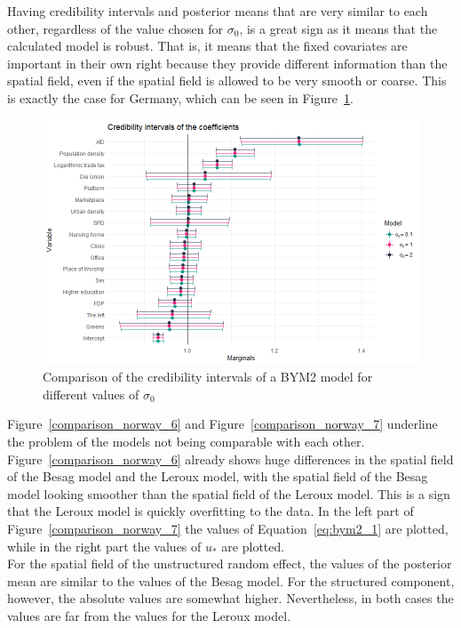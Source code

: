Having credibility intervals and posterior means that are very similar to each other, regardless of the value chosen for $\sigma_0$, is a great sign as it means that the calculated model is robust. That is, it means that the fixed covariates are important in their own right because they provide different information than the spatial field, even if the spatial field is allowed to be very smooth or coarse. This is exactly the case for Germany, which can be seen in Figure~\ref{comparison_germany_5}.
\begin{figure}[H]
    \centering
    \includegraphics[width = \textwidth]{intervals_prior_germany.png}
    \caption{Comparison of the credibility intervals of a BYM2 model for different values of $\sigma_0$}
    \label{comparison_germany_5}
\end{figure}
Figure~\ref{comparison_norway_6} and Figure~\ref{comparison_norway_7} underline the problem of the models not being comparable with each other. Figure~\ref{comparison_norway_6} already shows huge differences in the spatial field of the Besag model and the Leroux model, with the spatial field of the Besag model looking smoother than the spatial field of the Leroux model. This is a sign that the Leroux model is quickly overfitting to the data.
In the left part of Figure~\ref{comparison_norway_7} the values of Equation~\ref{eq:bym2_1} are plotted, while in the right part the values of $u_{*}$ are plotted. \\
For the spatial field of the unstructured random effect, the values of the posterior mean are similar to the values of the Besag model. For the structured component, however, the absolute values are somewhat higher. Nevertheless, in both cases the values are far from the values for the Leroux model.
